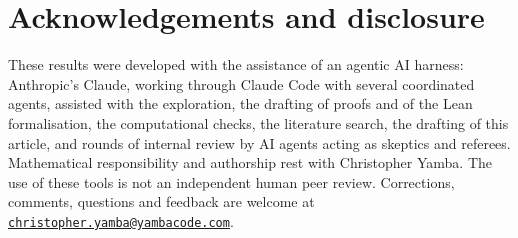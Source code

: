 \documentclass[11pt,a4paper]{article}
\begin{document}
\section*{Acknowledgements and disclosure}

These results were developed with the assistance of an agentic AI harness: Anthropic's Claude, working through Claude Code with several coordinated agents, assisted with the exploration, the drafting of proofs and of the Lean formalisation, the computational checks, the literature search, the drafting of this article, and rounds of internal review by AI agents acting as skeptics and referees. Mathematical responsibility and authorship rest with Christopher Yamba. The use of these tools is not an independent human peer review. Corrections, comments, questions and feedback are welcome at \href{mailto:christopher.yamba@yambacode.com}{\texttt{christopher.yamba@yambacode.com}}.


{\small}
\end{document}
